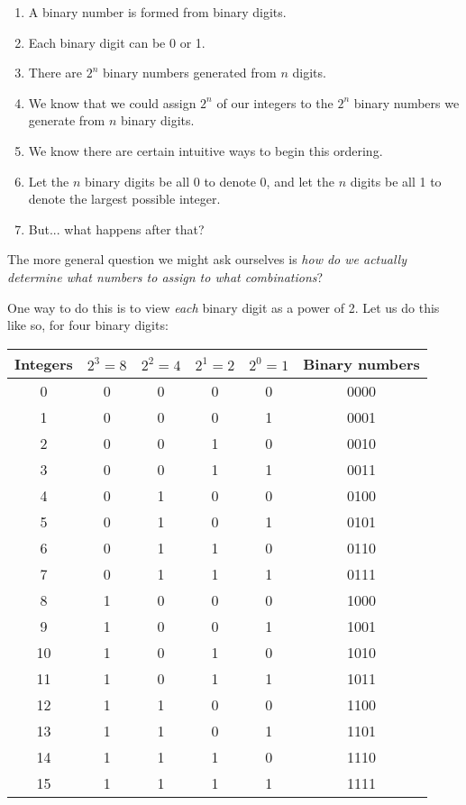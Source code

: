 \documentclass[12pt]{article}
\begin{document}
    \newpage

    \begin{enumerate}
        \item A binary number is formed from binary digits.
        \item Each binary digit can be 0 or 1.
        \item There are $2^n$ binary numbers generated from $n$ digits.
        \item We know that we could assign $2^n$ of our integers
        to the $2^n$ binary numbers we generate from $n$ binary digits.
        \item We know there are certain intuitive ways to begin this ordering.
        \item Let the $n$ binary digits be all 0 to denote 0, and let the $n$ digits be all 1 to denote the largest possible integer.
        \item But... what happens after that?
    \end{enumerate}

    The more general question we might ask ourselves is \textit{how do we actually determine what numbers to assign to what combinations}?

    One way to do this is to view \textit{each} binary digit as a power of 2. Let us do this like so, for four binary digits:

    \begin{center}
        \begin{tabular}{|c|c|c|c|c|c|}
          \hline
          Integers & $2^3 = 8$ & $2^2 = 4$ & $2^1 = 2$ & $2^0 = 1$ & Binary numbers \\
          \hline
          0 & 0 & 0 & 0 & 0 & 0000 \\
          1 & 0 & 0 & 0 & 1 & 0001 \\
          2 & 0 & 0 & 1 & 0 & 0010 \\
          3 & 0 & 0 & 1 & 1 & 0011 \\
          4 & 0 & 1 & 0 & 0 & 0100 \\
          5 & 0 & 1 & 0 & 1 & 0101 \\
          6 & 0 & 1 & 1 & 0 & 0110 \\         
          7 & 0 & 1 & 1 & 1 & 0111 \\
          8 & 1 & 0 & 0 & 0 & 1000 \\
          9 & 1 & 0 & 0 & 1 & 1001 \\
          10 & 1 & 0 & 1 & 0 & 1010 \\
          11 & 1 & 0 & 1 & 1 & 1011 \\
          12 & 1 & 1 & 0 & 0 & 1100 \\
          13 & 1 & 1 & 0 & 1 & 1101 \\
          14 & 1 & 1 & 1 & 0 & 1110 \\
          15 & 1 & 1 & 1 & 1 & 1111 \\
          \hline
        \end{tabular}
    \end{center}
\end{document}
